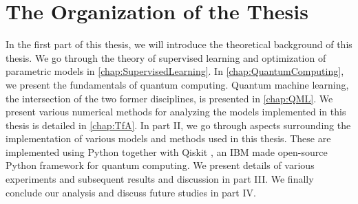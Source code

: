 \section{The Organization of the Thesis}
In the first part of this thesis, we will introduce the theoretical background of this thesis. We go through the theory of supervised learning and optimization of parametric models in \autoref{chap:SupervisedLearning}. In \autoref{chap:QuantumComputing}, we present the fundamentals of quantum computing. Quantum machine learning, the intersection of the two former disciplines, is presented in \autoref{chap:QML}. We present various numerical methods for analyzing the models implemented in this thesis is detailed in \autoref{chap:TfA}. In part II, we go through aspects surrounding the implementation of various models and methods used in this thesis. These are implemented using Python together with Qiskit \cite{Qiskit}, an IBM made open-source Python framework for quantum computing. We present details of various experiments and subsequent results and discussion in part III. We finally conclude our analysis and discuss future studies in part IV.

